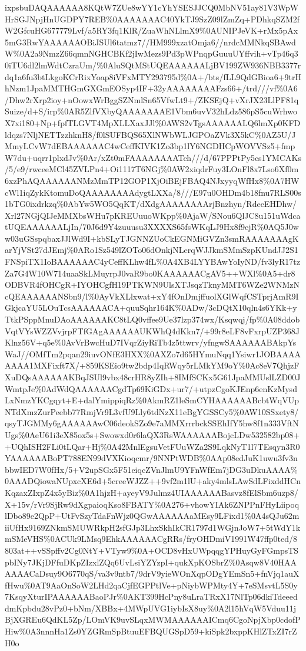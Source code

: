 \documentclass[]{article}
\begin{document}
ixpsbuDAQAAAAAA8KQtW7ZUe8wYY1cYhYSESJJCQ0MbNV51ay81V3WpWHrSGJNpjHnUGDPY7REB\%0AAAAAAAC40YkTJ9SzZ09lZmZq+PDhkqSZM2fW2GfcuHG677779Lvf/a5RY3fq1KlR/ZuaWhNLlmX9\%0AUNIPJeVK+rMx5pAx5mG3RwYAAAAAAOBiJSUl6tatmz7//HM999xzatOmja6//nrdcMMNkqSBAwdW\%0A2a9NmzZ66qmnNGHCBKf2jIwMezs9Pd3pWPnqpGuuuUYffvih+vTp46q30iTU6dl2lmWdtCzraUm/\%0AluSQtMStUQEAAAAAALjBV199ZW936NBB3377rdq1a6fu3btLkgoKCrRixYoap8iVFxMTY293795d\%0A+/bts/fLL9QdGBioa6+9trHhNzm1JpaMMTHGmGXGmEOSyp4IF+32yAAAAAAAAFzs66+/trd///vf\%0A6/Dhw2rXrp2ioy+nOowxWrBggSZNmlSn65VfwLt9+/ZKSEjQ+vXrJX23LlPF81qSuize/d+S/irp\%0AR5ZlfVXbyQAAAAAAAE1Vbm6uvV32hLdz586pS5cuWrhwoX7xi180+Np+fpfTLGVT4MpXLLXaxJJl\%0AWS2vTgsAAAAAALQ6lmXp0KFDldqzs7NljNETTzzhknH8/f0lSUFBQS65XlNWbWLJGPOaZVk3X5kC\%0AZ5U/JMmyLCvW7dEBAAAAAAC4wCeffKIVK1Zo3bp1lY6NGDHCpWOVVSz5+fmpW7du+uqrr1plxdJv\%0Ar/xZt0mFAAAAAAAATch///d/67PPPtPy5cs1YMCAKs/5/e9/rwceeMCl45ZVLPn4+Oi1117T6NGj\%0AW2xiqdrFuy3LOnFl8x7Lso6Xf0m6xzPhAQAAAAAANMzMmTP12GOP1XjOiBEjFBAQ4NJxyyqWfHx8\%0A7HWcWl1iqZykKtomuDoQAAAAAAAAdygtLXXa/8///E97u0OHDm4b18fnu7RLS00s1bTG0ixdrkzq\%0AbYw5WO5QqKT/dXdgAAAAAAAArjBnzhyn/RdeeEHDhw/Xrl27NGjQIJeMMXbsWHu7pKREUuuoWKpp\%0AjaW/SNou6QlJC8u151uWdcatUQEAAAAAALjIn/70J6d9Y4zuuusu3XXXXS65fsWKqLJ9Hx8f9ejR\%0AQ5J0ww03uGSspqbaxJJlWd9I+kbSLyTJGNNZUoCkEGNMiGVZn3smRAAAAAAAgKarYjVSt27dJEmj\%0ARo1Sz549lZOTo06dOnkjNLerqWJJkmSMmSzpKUndJJ2S1FNSpiTX1IoBAAAAAAC4yCeffKLhw4fL\%0A4XB4LYYBAwYoIyND/fv3lyR17tzZa7G4W10W714uaaSkLMuyrpJ0vaR9bo0KAAAAAACgAV5++WXl\%0A5+dr8ODBVR4fOHCgR+IYOHCgfH19PTKWN9UlsXTJsqzTknyMMT6WZe2WNMzNcQEAAAAAANSbn9/l\%0AyVkXLlxwat+xY4fOnDmjffuolXGlWqfCSTprjAmR9IGkjcaYU5LOuTcsAAAAAACA+quuSqhr164K\%0ADw/3cDQtX10qln4s6YKk+yTtkPSppMnuDAoAAAAAAKC8tLQ0vffee9Ue37lzp374wx/Ksqwqj/fp\%0A08ddobVqtVYsWZZVvjrpFTfGAgAAAAAAUKWhQ4dKkn7/+99r8eLF8vFxrpUZP368JKlnz56V+q5e\%0AvVrBwcHuD7IVqrZiyRiTb4z5ttwrv/yfngwSAAAAAABAkpYsWaJ//OMfTm2pqan29iuvONfE3HXX\%0AXZo7d65HYmuNqq1Ysiwr1JOBAAAAAAAA1MXFixft7X/+859KSEio9tw2bdp4IqRWqy5rLMkYM9oY\%0Ac8eV7QhjzFXuDQsAAAAAAKBqJSUl9vbx48crHR8yZIh+8IMfSCKx5G61JpaMMUslLZD00JWmtpJe\%0AdWdQAAAAAACgdTp69KiGDx+ur7/+utpzCgoKJEnp6enKzMysdLxNmzYKCgqyt+E+dalYmippiqRz\%0AkmRZ1leSmCYHAAAAAABcbtWqVUpNTdXmzZurPeebb77RmjVr9L3vfU9Lly6tdNzX11eBgYGSSCy5\%0AW10SSxety8/qsyTJGMMy6gAAAAAAwC06deokSZo9e7aMMXrrrbckSSEhIfY5hw8f1n333VftNUgs\%0AeU61i3eX85ox5s+Swowxd0r6laQX3RsWAAAAAABojcLDw532582bp08++UQhISH2FLi0tLQar+Hj\%0A42MnlEgsuVetFUuWZa2S9LqkNyT1l7TEsqyn3R0YAAAAAABoPT788EN99dVXKioqcmr/9NNPtWDB\%0AAp08edJuK1uwu3fv3nbbwIED7W0fHx/5+V2upSGx5F51eiqcZVnJlmU9YFnWfEm7jDG3uDkuAAAA\%0AAADQiowaNUpxcXE6d+5creeWJZZ++9vf2m1lU+aky4mlsLAwSdLFixddHCnKqzaxZIxpZ4x5yBiz\%0A1hjzH+ayeyV9Julmz4UIAAAAAABasvz8fElSbm6uzp8/X+15v/rVr9SjRw9dXgpaioqKso8FBATY\%0A276+vhowYIAk6ZNPPnFHyLiipoqlDbo89e2QpP+UtFvSzyTdaFnWjz0QGwAAAAAAaMEsy9LFixd1\%0A4sQJu62miiUfHx9169ZNkmSMUWRkpH2sfGJp3LhxSkhIkCR1797d1WGjnJoW7+5tWdY1kmSMeVHS\%0ACUk9LMsq9EhkAAAAAACgRRs/fryOHDmiV1991W47ffp0ted/8803at++vSSpffv2Cg0NtY+VTyw9\%0A+OCD8vHxUWpqqgYPHuyGyFGmpsTSpbINy7JKjDFfuDKpZIzxlZQq6UvLsiYZYzpI+qukXpKOSbrZ\%0Asqw8V40HAAAAAACaDsuy9O6770qS/va3v9ntb7/9drV9yieWOnXqpODgYEmSn5+fnVjq1auXfHwu\%0AT9AaOnSoW2LHd2qaCjfEGPPtlVe+pNiybWPMty4Y+7eSMsvtL5S0y7KsqyXturIPAAAAAABaoPJr\%0AKT399HcPny8uLraTRxX17NlTp06dkiTdeeeddmKpbdu28vPz0+bNm/XBBx+4MWpUVG1iybIsX8uy\%0A2l15hVqW5Vduu11jBjXGREu6QdKL5Zp/LOmVK9uvSLqxMWMAAAAAAICmq6CgoNpjXbp0cdofPHiw\%0A3nnnHa1Zs0YZGRmSpBtuuEFBQUGSpD59+kiSpk2bxppKHlZTxZI7rZH0o
\end{document}
